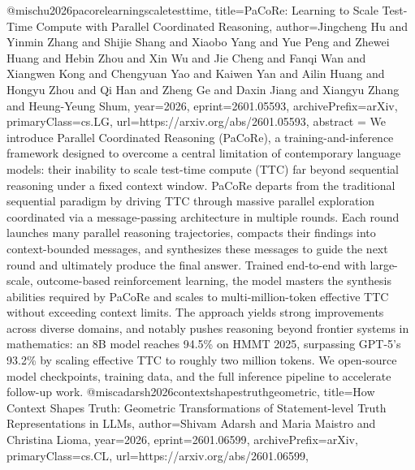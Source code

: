 {}@misc{hu2026pacorelearningscaletesttime,
      title={PaCoRe: Learning to Scale Test-Time Compute with Parallel Coordinated Reasoning}, 
      author={Jingcheng Hu and Yinmin Zhang and Shijie Shang and Xiaobo Yang and Yue Peng and Zhewei Huang and Hebin Zhou and Xin Wu and Jie Cheng and Fanqi Wan and Xiangwen Kong and Chengyuan Yao and Kaiwen Yan and Ailin Huang and Hongyu Zhou and Qi Han and Zheng Ge and Daxin Jiang and Xiangyu Zhang and Heung-Yeung Shum},
      year={2026},
      eprint={2601.05593},
      archivePrefix={arXiv},
      primaryClass={cs.LG},
      url={https://arxiv.org/abs/2601.05593},
      abstract = {We introduce Parallel Coordinated Reasoning (PaCoRe), a training-and-inference framework designed to overcome a central limitation of contemporary language models: their inability to scale test-time compute (TTC) far beyond sequential reasoning under a fixed context window. PaCoRe departs from the traditional sequential paradigm by driving TTC through massive parallel exploration coordinated via a message-passing architecture in multiple rounds. Each round launches many parallel reasoning trajectories, compacts their findings into context-bounded messages, and synthesizes these messages to guide the next round and ultimately produce the final answer. Trained end-to-end with large-scale, outcome-based reinforcement learning, the model masters the synthesis abilities required by PaCoRe and scales to multi-million-token effective TTC without exceeding context limits. The approach yields strong improvements across diverse domains, and notably pushes reasoning beyond frontier systems in mathematics: an 8B model reaches 94.5\% on HMMT 2025, surpassing GPT-5's 93.2\% by scaling effective TTC to roughly two million tokens. We open-source model checkpoints, training data, and the full inference pipeline to accelerate follow-up work.}
}@misc{adarsh2026contextshapestruthgeometric,
      title={How Context Shapes Truth: Geometric Transformations of Statement-level Truth Representations in LLMs}, 
      author={Shivam Adarsh and Maria Maistro and Christina Lioma},
      year={2026},
      eprint={2601.06599},
      archivePrefix={arXiv},
      primaryClass={cs.CL},
      url={https://arxiv.org/abs/2601.06599},
}
